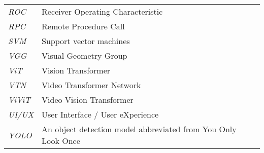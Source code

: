 \begin{changemargin}{-0.5cm}{0cm}
\begin{multicols*}{2}
\begin{supertabular}{>{\em}lp{6.2cm}}
ROC & Receiver Operating Characteristic \\ [.5em]
RPC & Remote Procedure Call \\ [.5em]
SVM & Support vector machines \\ [.5em]
VGG & Visual Geometry Group \\ [.5em]
ViT & Vision Transformer \\ [.5em]
VTN & Video Transformer Network \\ [.5em]
ViViT & Video Vision Transformer \\ [.5em]
UI/UX & User Interface / User eXperience \\ [.5em]
YOLO & An object detection model abbreviated from You Only Look Once \\ [.5em]
\end{supertabular}
\end{multicols*}
\end{changemargin}